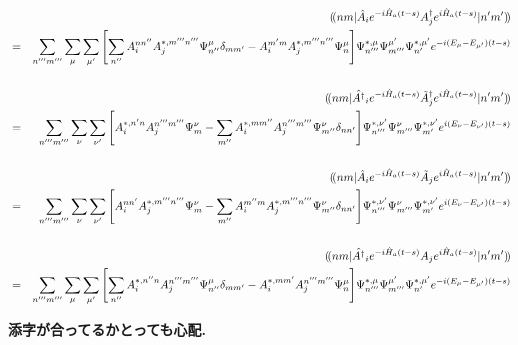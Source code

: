 \documentclass[10.5pt,a4paper]{jreport}
\newcommand{\dpbra}[1]{( \! ( #1 |}
\newcommand{\dpket}[1]{| #1 ) \! )}
\begin{document}
\begin{screen}
  \begin{eqnarray}
\nonumber    &&\dpbra{nm}\hat{A}_ie^{-i\hat{H}_a(t-s)}A_j^\dagger e^{i\hat{H}_a(t-s)}\dpket{n'm'}\\
\nonumber    &=&\sum_{n'''m'''}\sum_{\mu}\sum_{\mu'}\bqty{\sum_{n''}A_i^{nn''}A_j^{*, m'''n'''}\Psi_{n''}^{\mu}\delta_{mm'}- A_i^{m'm}A_j^{*, m'''n'''}\Psi_{n}^{\mu}}\Psi_{n'''}^{*, \mu}\Psi_{m'''}^{\mu'}\Psi_{n'}^{*, \mu'}e^{-i(E_\mu - E_{\mu'})(t-s)}\\\\
    \nonumber &&\dpbra{nm}\hat{A^\dagger}_ie^{-i\hat{H}_a(t-s)}\tilde{A}_j^\dagger e^{i\hat{H}_a(t-s)}\dpket{n'm'}\\
\nonumber    &=&\sum_{n'''m'''}\sum_{\nu}\sum_{\nu'}\bqty{A_i^{*, n'n}A_j^{n'''m'''}\Psi_{m}^{\nu}- \sum_{m''}A_i^{*, mm''}A_j^{n'''m'''}\Psi_{m''}^{\nu}\delta_{nn'}}\Psi_{n'''}^{*, \nu'}\Psi_{m'''}^{\nu}\Psi_{m'}^{*, \nu'}e^{i(E_\nu- E_{\nu'})(t-s)}\\\\
    \nonumber&&\dpbra{nm}\hat{A}_ie^{-i\hat{H}_a(t-s)}\tilde{A}_j e^{i\hat{H}_a(t-s)}\dpket{n'm'}\\
\nonumber    &=&\sum_{n'''m'''}\sum_{\nu}\sum_{\nu'}\bqty{A_i^{nn'}A_j^{*, m'''n'''}\Psi_{m}^{\nu}- \sum_{m''}A_i^{m''m}A_j^{*, m'''n'''}\Psi_{m''}^{\nu}\delta_{nn'} }\Psi_{n'''}^{*, \nu'}\Psi_{m'''}^{\nu}\Psi_{m'}^{*, \nu'}e^{i(E_\nu- E_{\nu'})(t-s)}\\\\
\nonumber    &&\dpbra{nm}\hat{A^\dagger}_ie^{-i\hat{H}_a(t-s)}A_j e^{i\hat{H}_a(t-s)}\dpket{n'm'}\\
    \nonumber &=&\sum_{n'''m'''}\sum_{ {\mu}}\sum_{ {\mu'}}\bqty{\sum_{n''}A_i^{ {*, n''n}}A_j^{n'''m'''}\Psi_{n''}^{\mu}\delta_{mm'} - A_i^{*, mm'}A_j^{n'''m'''}\Psi_{n}^{\mu}}\Psi_{n'''}^{*, \mu}\Psi_{m'''}^{\mu'}\Psi_{n'}^{*, \mu'}e^{ {-i(E_\mu- E_{\mu'})(t-s)}}\\
  \end{eqnarray}
\end{screen}
\textbf{添字が合ってるかとっても心配.}
\end{document}
